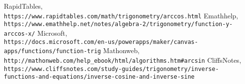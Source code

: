 \documentclass{article}
\begin{document}
\begin{thebibliography}{9}
RapidTables,
\\\texttt{https://www.rapidtables.com/math/trigonometry/arccos.html}
Emathhelp,
\\\texttt{https://www.emathhelp.net/notes/algebra-2/trigonometry/function-y-arccos-x/}
Microsoft,
\\\texttt{https://docs.microsoft.com/en-us/powerapps/maker/canvas-apps/functions/function-trig}
Mathonweb,
\\\texttt{http://mathonweb.com/help_ebook/html/algorithms.htm#arcsin}
CliffsNotes,
\\\texttt{https://www.cliffsnotes.com/study-guides/trigonometry/inverse-functions-and-equations/inverse-cosine-and-inverse-sine}
\end{thebibliography}
\newpage
\end{document}
